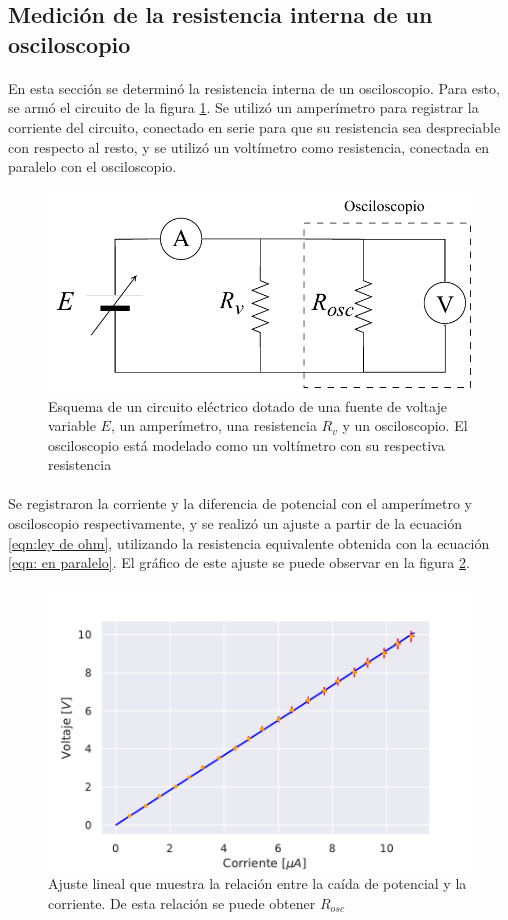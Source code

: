\subsection{Medición de la resistencia interna de un osciloscopio} \label{sec:resistencia de osc}

\paragraph{}
En esta sección se determinó la resistencia interna de un osciloscopio. Para esto, se armó el circuito de la figura \ref{fig:esq_osciloscopio}. Se utilizó un amperímetro para registrar la corriente del circuito, conectado en serie para que su resistencia sea despreciable con respecto al resto, y se utilizó un voltímetro como resistencia, conectada en paralelo con el osciloscopio.

\begin{figure}[H]
    \centering
    \includegraphics[width = 0.6\linewidth]{Esquemas/Osciloscopio.pdf}
    \caption{Esquema de un circuito eléctrico dotado de una fuente de voltaje variable $E$, un amperímetro, una resistencia $R_v$ y un osciloscopio. El osciloscopio está modelado como un voltímetro con su respectiva resistencia}
    \label{fig:esq_osciloscopio}
\end{figure}

\paragraph{}
Se registraron la corriente y la diferencia de potencial con el amperímetro y osciloscopio respectivamente, y se realizó un ajuste a partir de la ecuación \ref{eqn:ley de ohm}, utilizando la resistencia equivalente obtenida con la ecuación \ref{eqn: en paralelo}. El gráfico de este ajuste se puede observar en la figura \ref{fig:fig_osciloscopio}.

\begin{figure}[H]
    \centering
    \includegraphics[width = 0.65\linewidth]{figuras/resistencia osc.pdf}
    \caption{Ajuste lineal que muestra la relación entre la caída de potencial y la corriente. De esta relación se puede obtener $R_{osc}$}
    \label{fig:fig_osciloscopio}
\end{figure}


